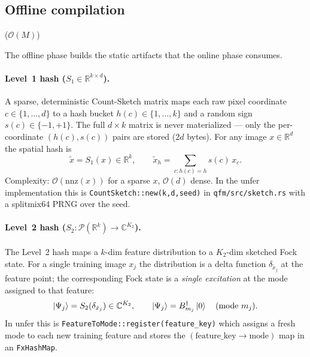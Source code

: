 \documentclass[11pt, a4paper]{article}
\newcommand{\Rset}{\mathbb{R}}
\newcommand{\Cset}{\mathbb{C}}
\begin{document}
\subsection{Offline compilation }
($\mathcal{O}(M)$)

The offline phase builds the static artifacts that the online phase consumes.

\paragraph{Level~1 hash ($S_1\in\Rset^{k\times d}$).} A sparse, deterministic
Count-Sketch matrix maps each raw pixel coordinate $c\in\{1,\dots,d\}$ to a
hash bucket $h(c)\in\{1,\dots,k\}$ and a random sign $s(c)\in\{-1,+1\}$. The
full $d\times k$ matrix is never materialized --- only the per-coordinate
$(h(c),s(c))$ pairs are stored ($2d$ bytes). For any image $x\in\Rset^d$ the
spatial hash is
\begin{equation}
  \tilde x=S_1(x)\in\Rset^k,\qquad \tilde x_h=\sum_{c:h(c)=h}s(c)\,x_c .
\end{equation}
Complexity: $\mathcal{O}(\mathrm{nnz}(x))$ for a sparse $x$, $\mathcal{O}(d)$
dense. In the unfer implementation this is
\texttt{CountSketch::new(k,d,seed)} in \texttt{qfm/src/sketch.rs} with a
splitmix64 PRNG over the seed.

\paragraph{Level~2 hash ($S_2:\mathcal{P}(\Rset^k)\to\Cset^{K_2}$).} The
Level~2 hash maps a $k$-dim feature distribution to a $K_2$-dim sketched
Fock state. For a single training image $x_j$ the distribution is a delta
function $\delta_{\tilde x_j}$ at the feature point; the corresponding Fock
state is a \emph{single excitation} at the mode assigned to that feature:
\begin{equation}
  \ket{\Psi_j}=S_2(\delta_{\tilde x_j})\in\Cset^{K_2},\qquad
  \ket{\Psi_j}=B^\dagger_{m_j}\ket{0}\quad\text{(mode }m_j\text{)} .
\end{equation}
In unfer this is \texttt{FeatureToMode::register(feature\_key)} which assigns
a fresh mode to each new training feature and stores the
$(\text{feature\_key}\to\text{mode})$ map in an \texttt{FxHashMap}.
\end{document}
